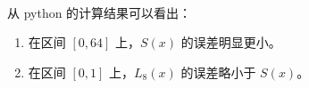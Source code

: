 \documentclass[11pt]{article}
\providecommand{\tightlist}{%
      \setlength{\itemsep}{0pt}\setlength{\parskip}{0pt}}
\begin{document}
    \begin{center}
    \end{center}
    { \hspace*{\fill} \\}
    
    从 python 的计算结果可以看出：

\begin{enumerate}
\def\labelenumi{\arabic{enumi}.}
\tightlist
\item
  在区间 \([0, 64]\) 上，\(S(x)\) 的误差明显更小。
\item
  在区间 \([0, 1]\) 上，\(L_8(x)\) 的误差略小于 \(S(x)\)。
\end{enumerate}


    
    
    
\end{document}
